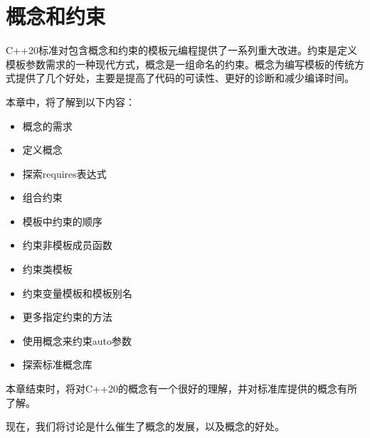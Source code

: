 \chapter{概念和约束}
C++20标准对包含概念和约束的模板元编程提供了一系列重大改进。约束是定义模板参数需求的一种现代方式，概念是一组命名的约束。概念为编写模板的传统方式提供了几个好处，主要是提高了代码的可读性、更好的诊断和减少编译时间。

本章中，将了解到以下内容：

\begin{itemize}
  \item 概念的需求
  \item 定义概念
  \item 探索requires表达式
  \item 组合约束
  \item 模板中约束的顺序
  \item 约束非模板成员函数
  \item 约束类模板
  \item 约束变量模板和模板别名
  \item 更多指定约束的方法
  \item 使用概念来约束auto参数
  \item 探索标准概念库
\end{itemize}

本章结束时，将对C++20的概念有一个很好的理解，并对标准库提供的概念有所了解。

现在，我们将讨论是什么催生了概念的发展，以及概念的好处。














